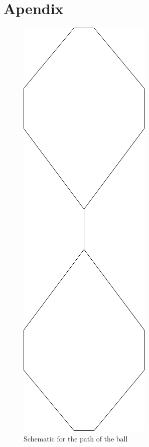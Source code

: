 \chapter{Apendix}

\begin{figure}[htpb]
    \centering
    \includegraphics[width=\textwidth]{figures/plots/ballMove}
    \caption{ Schematic for the path of the ball }
    \label{fig:ballMove}
  \end{figure}


